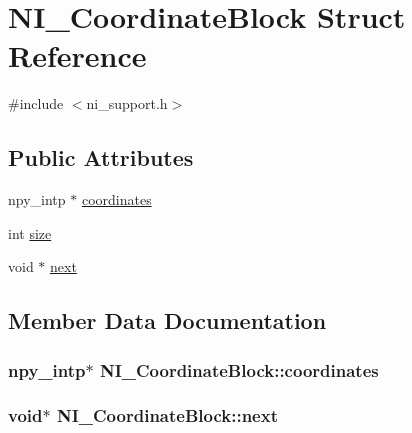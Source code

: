 \hypertarget{structNI__CoordinateBlock}{}\section{N\+I\+\_\+\+Coordinate\+Block Struct Reference}
\label{structNI__CoordinateBlock}


{\ttfamily \#include $<$ni\+\_\+support.\+h$>$}

\subsection*{Public Attributes}
\begin{DoxyCompactItemize}
\item 
npy\+\_\+intp $\ast$ \hyperlink{structNI__CoordinateBlock_a736c726803e37553e3fc5234de9937bd}{coordinates}
\item 
int \hyperlink{structNI__CoordinateBlock_ac630a7634e905ecbc5fa583dc420c176}{size}
\item 
void $\ast$ \hyperlink{structNI__CoordinateBlock_a5c74ca30da0a059dc1764bc372619eb8}{next}
\end{DoxyCompactItemize}


\subsection{Member Data Documentation}
\hypertarget{structNI__CoordinateBlock_a736c726803e37553e3fc5234de9937bd}{}
\subsubsection[{coordinates}]{\setlength{\rightskip}{0pt plus 5cm}npy\+\_\+intp$\ast$ N\+I\+\_\+\+Coordinate\+Block\+::coordinates}\label{structNI__CoordinateBlock_a736c726803e37553e3fc5234de9937bd}
\hypertarget{structNI__CoordinateBlock_a5c74ca30da0a059dc1764bc372619eb8}{}
\subsubsection[{next}]{\setlength{\rightskip}{0pt plus 5cm}void$\ast$ N\+I\+\_\+\+Coordinate\+Block\+::next}\label{structNI__CoordinateBlock_a5c74ca30da0a059dc1764bc372619eb8}
\hypertarget{structNI__CoordinateBlock_ac630a7634e905ecbc5fa583dc420c176}{}

